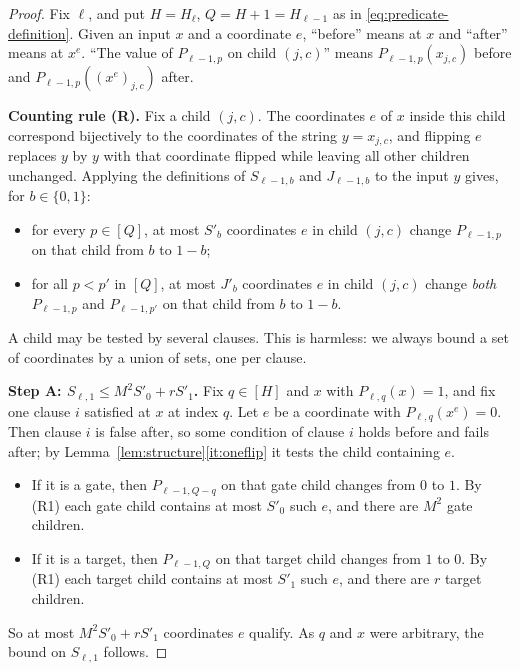 \documentclass[11pt]{article}
\theoremstyle{definition}
\theoremstyle{remark}
\begin{document}
\begin{proof}
Fix \(\ell\), and put \(H=H_\ell\), \(Q=H+1=H_{\ell-1}\) as in
\eqref{eq:predicate-definition}. Given an input \(x\) and a coordinate \(e\),
``before'' means at \(x\) and ``after'' means at \(x^e\). ``The value of
\(P_{\ell-1,p}\) on child \((j,c)\)'' means \(P_{\ell-1,p}(x_{j,c})\) before
and \(P_{\ell-1,p}((x^e)_{j,c})\) after.

\medskip\noindent\textbf{Counting rule (R).}
Fix a child \((j,c)\). The coordinates \(e\) of \(x\) inside this child
correspond bijectively to the coordinates of the string \(y=x_{j,c}\), and
flipping \(e\) replaces \(y\) by \(y\) with that coordinate flipped while
leaving all other children unchanged. Applying the definitions of
\(S_{\ell-1,b}\) and \(J_{\ell-1,b}\) to the input \(y\) gives, for
\(b\in\{0,1\}\):
\begin{itemize}[nosep]
\item[(R1)] for every \(p\in[Q]\), at most \(S'_b\) coordinates \(e\) in child
 \((j,c)\) change \(P_{\ell-1,p}\) on that child from \(b\) to \(1-b\);
\item[(R2)] for all \(p<p'\) in \([Q]\), at most \(J'_b\) coordinates \(e\) in
 child \((j,c)\) change \emph{both} \(P_{\ell-1,p}\) and \(P_{\ell-1,p'}\) on
 that child from \(b\) to \(1-b\).
\end{itemize}
A child may be tested by several clauses. This is harmless: we always bound
a set of coordinates by a union of sets, one per clause.

\medskip\noindent\textbf{Step A: \(S_{\ell,1}\le M^2S'_0+rS'_1\).}
Fix \(q\in[H]\) and \(x\) with \(P_{\ell,q}(x)=1\), and fix one clause \(i\)
satisfied at \(x\) at index \(q\). Let \(e\) be a coordinate with
\(P_{\ell,q}(x^e)=0\). Then clause \(i\) is false after, so some condition
of clause \(i\) holds before and fails after; by
Lemma~\ref{lem:structure}\ref{it:oneflip} it tests the child containing
\(e\).
\begin{itemize}[nosep]
\item If it is a gate, then \(P_{\ell-1,Q-q}\) on that gate child changes
 from \(0\) to \(1\). By (R1) each gate child contains at most \(S'_0\)
 such \(e\), and there are \(M^2\) gate children.
\item If it is a target, then \(P_{\ell-1,Q}\) on that target child changes
 from \(1\) to \(0\). By (R1) each target child contains at most \(S'_1\)
 such \(e\), and there are \(r\) target children.
\end{itemize}
So at most \(M^2S'_0+rS'_1\) coordinates \(e\) qualify. As \(q\) and \(x\)
were arbitrary, the bound on \(S_{\ell,1}\) follows.


\end{proof}
\end{document}
